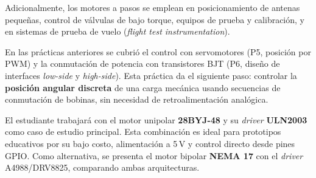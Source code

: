 \documentclass[11pt]{article}
\begin{document}
Adicionalmente, los motores a pasos se emplean en posicionamiento de antenas pequeñas,
control de válvulas de bajo torque, equipos de prueba y calibración, y en sistemas de
prueba de vuelo (\emph{flight test instrumentation}).

En las prácticas anteriores se cubrió el control con servomotores (P5, posición por PWM)
y la conmutación de potencia con transistores BJT (P6, diseño de interfaces
\emph{low-side} y \emph{high-side}). Esta práctica da el siguiente paso: controlar la
\textbf{posición angular discreta} de una carga mecánica usando secuencias de conmutación
de bobinas, sin necesidad de retroalimentación analógica.

El estudiante trabajará con el motor unipolar \textbf{28BYJ-48} y su \emph{driver}
\textbf{ULN2003} como caso de estudio principal. Esta combinación es ideal para
prototipos educativos por su bajo costo, alimentación a 5\,V y control directo desde
pines GPIO. Como alternativa, se presenta el motor bipolar \textbf{NEMA 17} con el
\emph{driver} A4988/DRV8825, comparando ambas arquitecturas.

\end{document}
